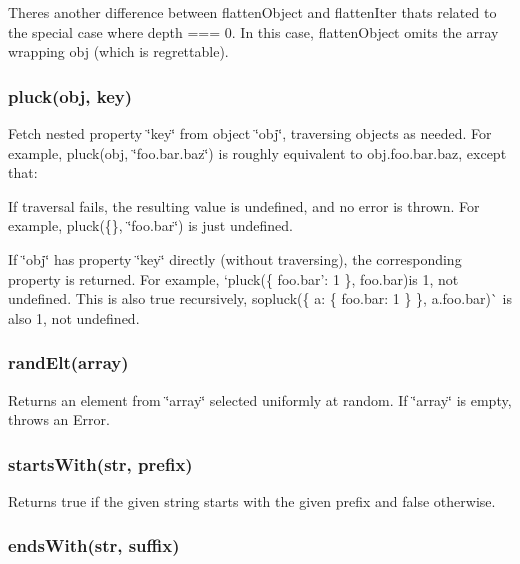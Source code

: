 There\textquotesingle{}s another difference between {\ttfamily flatten\+Object} and {\ttfamily flatten\+Iter} that\textquotesingle{}s related to the special case where {\ttfamily depth === 0}. In this case, {\ttfamily flatten\+Object} omits the array wrapping {\ttfamily obj} (which is regrettable).

\subsubsection*{pluck(obj, key)}

Fetch nested property \char`\"{}key\char`\"{} from object \char`\"{}obj\char`\"{}, traversing objects as needed. For example, {\ttfamily pluck(obj, \char`\"{}foo.\+bar.\+baz\char`\"{})} is roughly equivalent to {\ttfamily obj.\+foo.\+bar.\+baz}, except that\+:


\begin{DoxyEnumerate}
\item If traversal fails, the resulting value is undefined, and no error is thrown. For example, {\ttfamily pluck(\{\}, \char`\"{}foo.\+bar\char`\"{})} is just undefined.
\item If \char`\"{}obj\char`\"{} has property \char`\"{}key\char`\"{} directly (without traversing), the corresponding property is returned. For example, `pluck(\{ \textquotesingle{}foo.\+bar'\+: 1 \}, \textquotesingle{}foo.\+bar\textquotesingle{}){\ttfamily is 1, not undefined. This is also true recursively, so}pluck(\{ \textquotesingle{}a\textquotesingle{}\+: \{ \textquotesingle{}foo.\+bar\textquotesingle{}\+: 1 \} \}, \textquotesingle{}a.\+foo.\+bar\textquotesingle{})\`{} is also 1, not undefined.
\end{DoxyEnumerate}

\subsubsection*{rand\+Elt(array)}

Returns an element from \char`\"{}array\char`\"{} selected uniformly at random. If \char`\"{}array\char`\"{} is empty, throws an Error.

\subsubsection*{starts\+With(str, prefix)}

Returns true if the given string starts with the given prefix and false otherwise.

\subsubsection*{ends\+With(str, suffix)}

